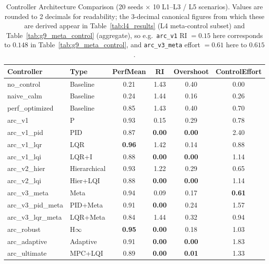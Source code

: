 \documentclass{article}
\begin{document}
\begin{table}[htbp]
\centering
\caption{Controller Architecture Comparison (20 seeds $\times$ 10 L1--L3 / L5 scenarios). Values are rounded to 2 decimals for readability; the 3-decimal canonical figures from which these are derived appear in Table~\ref{tab:l4_results} (L4 meta-control subset) and Table~\ref{tab:g9_meta_control} (aggregate), so e.g.\ \texttt{arc\_v1} RI $=0.15$ here corresponds to $0.148$ in Table~\ref{tab:g9_meta_control}, and \texttt{arc\_v3\_meta} effort $=0.61$ here to $0.615$.}
\label{tab:controller_comparison}
\footnotesize
\begin{adjustbox}{max width=0.88\textwidth}
\begin{tabular}{@{}llcccc@{}}
\toprule
Controller & Type & PerfMean & RI & Overshoot & ControlEffort \\ \midrule
no\_control & Baseline & 0.21 & 1.43 & 0.40 & 0.00 \\
naive\_calm & Baseline & 0.24 & 1.44 & 0.16 & 0.26 \\
perf\_optimized & Baseline & 0.85 & 1.43 & 0.40 & 0.70 \\
arc\_v1 & P & 0.93 & 0.15 & 0.29 & 0.78 \\
arc\_v1\_pid & PID & 0.87 & \textbf{0.00} & \textbf{0.00} & 2.40 \\
arc\_v1\_lqr & LQR & \textbf{0.96} & 1.42 & 0.14 & 0.88 \\
arc\_v1\_lqi & LQR+I & 0.88 & \textbf{0.00} & \textbf{0.00} & 1.14 \\
arc\_v2\_hier & Hierarchical & 0.93 & 1.22 & 0.29 & 0.65 \\
arc\_v2\_lqi & Hier+LQI & 0.88 & \textbf{0.00} & \textbf{0.00} & 1.14 \\
arc\_v3\_meta & Meta & 0.94 & 0.09 & 0.17 & \textbf{0.61} \\
arc\_v3\_pid\_meta & PID+Meta & 0.91 & \textbf{0.00} & 0.24 & 1.57 \\
arc\_v3\_lqr\_meta & LQR+Meta & 0.84 & 1.44 & 0.32 & 0.94 \\
arc\_robust & H$\infty$ & \textbf{0.95} & \textbf{0.00} & 0.18 & 1.03 \\
arc\_adaptive & Adaptive & 0.91 & \textbf{0.00} & \textbf{0.00} & 1.83 \\
arc\_ultimate & MPC+LQI & 0.89 & \textbf{0.00} & \textbf{0.01} & 1.33 \\ \bottomrule
\end{tabular}
\end{adjustbox}
\end{table}
\end{document}
